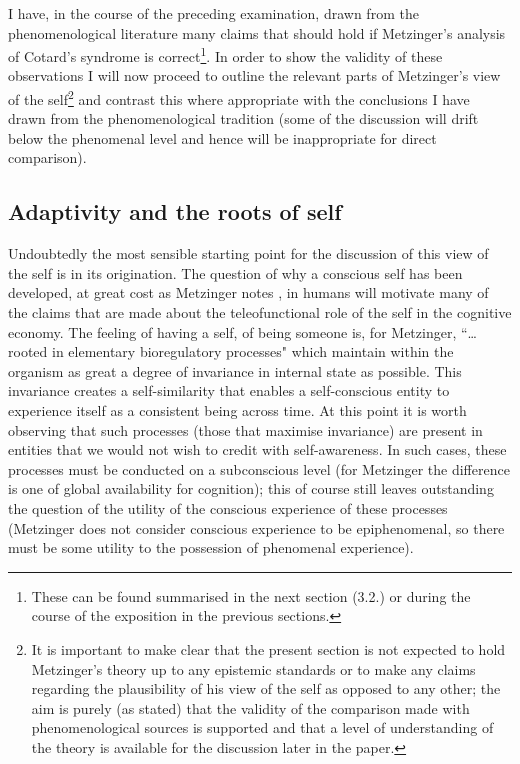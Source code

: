 I have, in the course of the preceding examination, drawn from the phenomenological literature many claims that should hold if Metzinger's analysis of Cotard's syndrome is correct\footnote{These can be found summarised in the next section (3.2.) or during the course of the exposition in the previous sections.}. In order to show the validity of these observations I will now proceed to outline the relevant parts of Metzinger's view of the self\footnote{It is important to make clear that the present section is not expected to hold Metzinger's theory up to any epistemic standards or to make any claims regarding the plausibility of his view of the self as opposed to any other; the aim is purely (as stated) that the validity of the comparison made with phenomenological sources is supported and that a level of understanding of the theory is available for the discussion later in the paper.} and contrast this where appropriate with the conclusions I have drawn from the phenomenological tradition (some of the discussion will drift below the phenomenal level and hence will be inappropriate for direct comparison).

\subsection{Adaptivity and the roots of self}
\label{metzinger_self_adaptivity}

Undoubtedly the most sensible starting point for the discussion of this view of the self is in its origination. The question of why a conscious self has been developed, at great cost as Metzinger notes \cite[p. 347]{metzinger2003}, in humans will motivate many of the claims that are made about the teleofunctional role of the self in the cognitive economy. The feeling of having a self, of being someone is, for Metzinger, ``\ldots rooted in elementary bioregulatory processes" \cite[p. 345]{metzinger2003} which maintain within the organism as great a degree of invariance in internal state as possible. This invariance creates a self-similarity that enables a self-conscious entity to experience itself as a consistent being across time. At this point it is worth observing that such processes (those that maximise invariance) are present in entities that we would not wish to credit with self-awareness. In such cases, these processes must be conducted on a subconscious level (for Metzinger the difference is one of global availability for cognition); this of course still leaves outstanding the question of the utility of the conscious experience of these processes (Metzinger does not consider conscious experience to be epiphenomenal, so there must be some utility to the possession of phenomenal experience).

